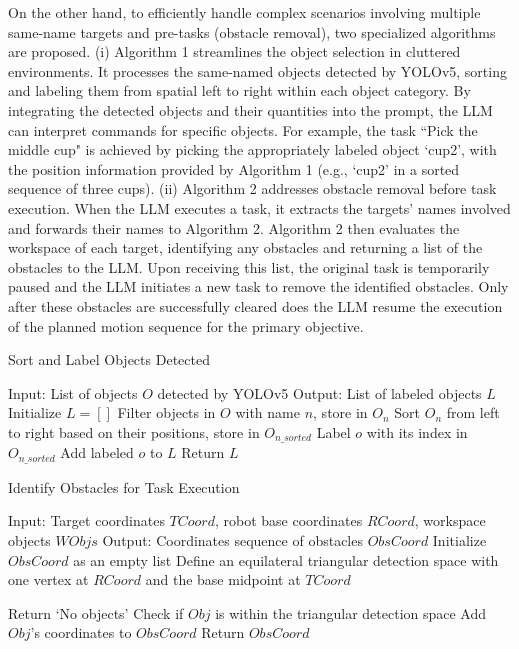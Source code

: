 \documentclass[letterpaper,conference]{ieeeconf}
\begin{document}
On the other hand, to efficiently handle complex scenarios involving multiple same-name targets and pre-tasks (obstacle removal), two specialized algorithms are proposed. 
(i) Algorithm 1 streamlines the object selection in cluttered environments. It processes the same-named objects detected by YOLOv5, sorting and labeling them from spatial left to right within each object category. By integrating the detected objects and their quantities into the prompt, the LLM can interpret commands for specific objects. For example, the task ``Pick the middle cup" is achieved by picking the appropriately labeled object `cup2', with the position information provided by Algorithm 1 (e.g., `cup2' in a sorted sequence of three cups).
(ii) Algorithm 2 addresses obstacle removal before task execution.
When the LLM executes a task, it extracts the targets' names involved and forwards their names to Algorithm 2. Algorithm 2 then evaluates the workspace of each target, identifying any obstacles and returning a list of the obstacles to the LLM. Upon receiving this list, the original task is temporarily paused and the LLM initiates a new task to remove the identified obstacles. Only after these obstacles are successfully cleared does the LLM resume the execution of the planned motion sequence for the primary objective.
\begin{algorithm}
\caption{Sort and Label Objects Detected}
\small
\label{alg:1}
\begin{algorithmic}[1]
\State Input: List of objects $O$ detected by YOLOv5
\State Output: List of labeled objects $L$
\State Initialize $L = []$
    \State Filter objects in $O$ with name $n$, store in $O_n$
    \State Sort $O_n$ from left to right based on their positions, store in $O_{n\_sorted}$
        \State Label $o$ with its index in $O_{n\_sorted}$
        \State Add labeled $o$ to $L$
    \EndFor
\EndFor
\State Return $L$
\end{algorithmic}
\end{algorithm}
\begin{algorithm}
\caption{Identify Obstacles for Task Execution}
\small
\label{alg:2}
\begin{algorithmic}[1]
\State Input: Target coordinates $TCoord$, robot base coordinates $RCoord$, workspace objects $WObjs$
\State Output: Coordinates sequence of obstacles $ObsCoord$
\State Initialize $ObsCoord$ as an empty list
\State Define an equilateral triangular detection space with one vertex at $RCoord$ and the base midpoint at $TCoord$

    \State Return `No objects'
\EndIf
{}
    \State Check if $Obj$ is within the triangular detection space
        \State Add $Obj$'s coordinates to $ObsCoord$
    \EndIf
\EndFor
\State Return $ObsCoord$
\end{algorithmic}
\end{algorithm}
\vspace{-2mm}
\end{document}

